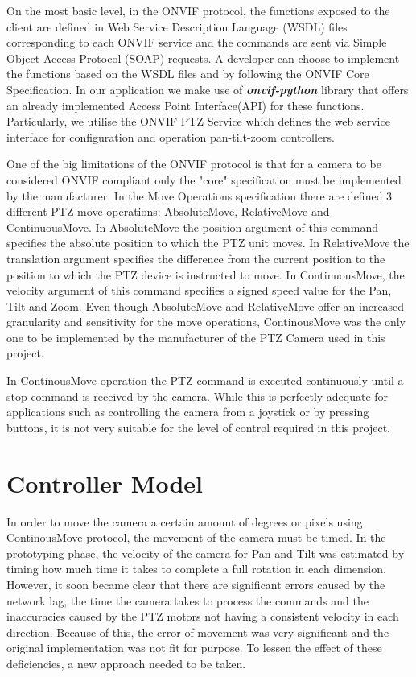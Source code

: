 \documentclass{l4proj}
\begin{document}
On the most basic level, in the ONVIF protocol, the functions exposed to the client are defined in Web Service Description Language (WSDL) files corresponding to each ONVIF service and the commands are sent via Simple Object Access Protocol (SOAP) requests. A developer can choose to implement the functions based on the WSDL files and by following the ONVIF Core Specification. In our application we make use of
\textbf{\textit{onvif-python}} library that offers an already implemented Access Point Interface(API) for these functions. Particularly, we utilise the ONVIF PTZ Service which defines the web service interface for configuration and operation pan-tilt-zoom controllers. 



One of the big limitations of the ONVIF protocol is that for a camera to be considered ONVIF compliant only the "core" specification must be implemented by the manufacturer. In the Move Operations specification there are defined 3 different PTZ move operations: AbsoluteMove, RelativeMove and ContinuousMove. In AbsoluteMove the position argument of this command specifies the absolute position to which the PTZ unit moves. In RelativeMove the translation argument specifies the difference from the current position to the position to which the PTZ device is instructed to move. In ContinuousMove, the velocity argument of this command specifies a signed speed value for the Pan, Tilt and Zoom.  Even though AbsoluteMove and RelativeMove offer an increased granularity and sensitivity for the move operations,  ContinousMove was the only one to be implemented by the manufacturer of the PTZ Camera used in this project. 

In ContinousMove operation the PTZ command is executed continuously until a stop command is received by the camera. While this is perfectly adequate for applications such as controlling the camera from a joystick or by pressing buttons, it is not very suitable for the level of control required in this project. 



\section{Controller Model}

In order to move the camera a certain amount of degrees or pixels using ContinousMove protocol, the movement of the camera must be timed. In the prototyping phase, the velocity of the camera for Pan and Tilt was estimated by timing how much time it takes to complete a full rotation in each dimension. However, it soon became clear that there are significant errors caused by the network lag, the time the camera takes to process the commands and the inaccuracies caused by the PTZ motors not having a consistent velocity in each direction. Because of this, the error of movement was very significant and the original implementation was not fit for purpose. To lessen the effect of these deficiencies, a new approach needed to be taken. 
\end{document}
